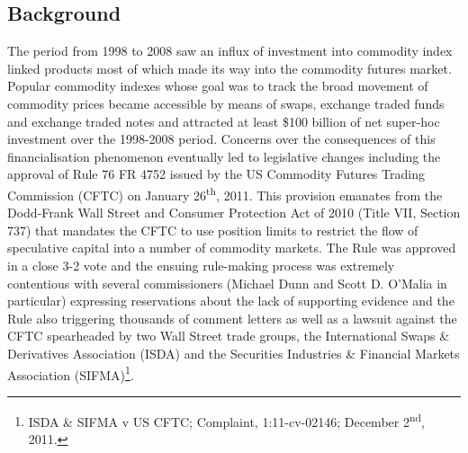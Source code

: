 \documentclass[]{elsarticle} %
\begin{document}
\hypertarget{co-movement-background}{%
\subsection{Background}\label{co-movement-background}}

The period from 1998 to 2008 saw an influx of investment into commodity index linked products most of which made its way into the commodity futures market. Popular commodity indexes whose goal was to track the broad movement of commodity prices became accessible by means of swaps, exchange traded funds and exchange traded notes and attracted at least \$100 billion of net super-hoc investment over the 1998-2008 period. Concerns over the consequences of this financialisation phenomenon eventually led to legislative changes including the approval of Rule 76 FR 4752 issued by the US Commodity Futures Trading Commission (CFTC) on January 26\textsuperscript{th}, 2011. This provision emanates from the Dodd-Frank Wall Street and Consumer Protection Act of 2010 (Title VII, Section 737) that mandates the CFTC to use position limits to restrict the flow of speculative capital into a number of commodity markets. The Rule was approved in a close 3-2 vote and the ensuing rule-making process was extremely contentious with several commissioners (Michael Dunn and Scott D. O'Malia in particular) expressing reservations about the lack of supporting evidence and the Rule also triggering thousands of comment letters as well as a lawsuit against the CFTC spearheaded by two Wall Street trade groups, the International Swaps \& Derivatives Association (ISDA) and the Securities Industries \& Financial Markets Association (SIFMA)\footnote{ISDA \& SIFMA v US CFTC; Complaint, 1:11-cv-02146; December 2\textsuperscript{nd}, 2011.}.\\
\end{document}
